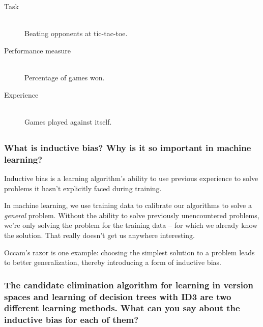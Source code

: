\documentclass[11pt,a4paper]{article}
\begin{document}
        \begin{description}
          \item[Task] \hfill \\
            Beating opponents at tic-tac-toe.
          \item[Performance measure] \hfill \\
            Percentage of games won.
          \item[Experience] \hfill \\
            Games played against itself.
        \end{description}
      
    
    
    \subsection{} %
      
      \subsubsection{What is inductive bias? Why is it so important in machine learning?} %
      \label{ssub:what_is_inductive_bias_why_is_it_so_important_in_machine_learning}
        
        Inductive bias is a learning algorithm's ability to use previous experience to solve problems it hasn't explicitly faced during training.
        
        In machine learning, we use training data to calibrate our algorithms to solve a \emph{general} problem.
        Without the ability to solve previously unencountered problems, we're only solving the problem for the training data -- for which we already know the solution. That really doesn't get us anywhere interesting.
        
        Occam's razor is one example: choosing the simplest solution to a problem leads to better generalization, thereby introducing a form of inductive bias.
        
      
      \subsubsection{The candidate elimination algorithm for learning in version spaces and learning of decision trees with ID3 are two different learning methods. What can you say about the inductive bias for each of them?} %
      \label{ssub:the_candidate_elimination_algorithm}
        
\end{document}
